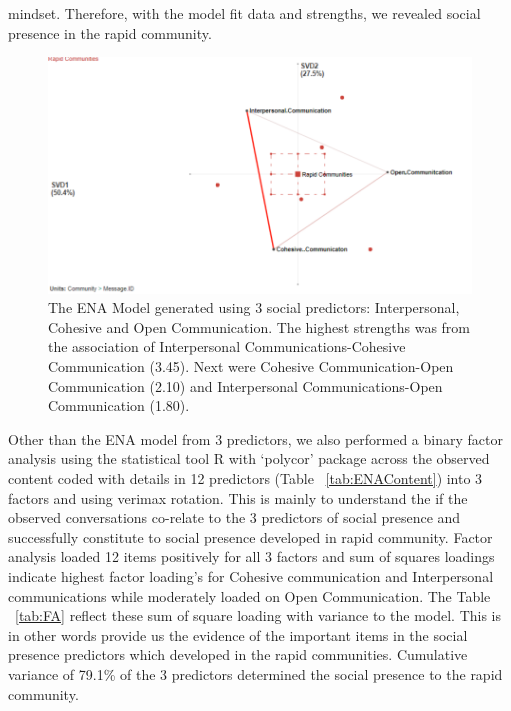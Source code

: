 \documentclass[manuscript,screen,review]{acmart}
\begin{document}
mindset. Therefore, with the model fit data and strengths, we revealed social presence in the rapid community. 
\begin{figure}[h]
  \centering
  \includegraphics[width=\linewidth]{images/ENASocialP.png}
  \caption{The ENA Model generated using 3 social predictors: Interpersonal, Cohesive and Open Communication. The highest  strengths was from the association of Interpersonal Communications-Cohesive Communication (3.45). Next were Cohesive Communication-Open Communication (2.10) and Interpersonal Communications-Open Communication (1.80).   }
 \label{fig:primary}
\end{figure}

Other than the ENA model from 3 predictors, we also performed a binary factor analysis using the statistical tool R with ‘polycor’ package across the observed content coded with details in 12 predictors (Table ~\ref{tab:ENAContent}) into 3 factors and using verimax rotation. This is mainly to understand the if the observed conversations co-relate to the 3 predictors of social presence and successfully constitute to social presence developed in rapid community. Factor analysis loaded 12 items positively for all 3 factors and sum of squares loadings indicate highest factor loading's for Cohesive communication and Interpersonal communications while moderately loaded on Open Communication. The Table ~\ref{tab:FA} reflect these sum of square loading with variance to the model. This is in other words provide us the evidence of the important items in the social presence predictors which developed in the rapid communities. Cumulative variance of 79.1\% of the 3 predictors determined the social presence to the rapid community. 
\end{document}
